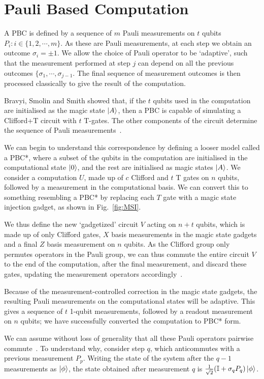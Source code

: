 \documentclass{standalone}
\begin{document}
\section{Pauli Based Computation}\label{sec:pbc}
A PBC is defined by a sequence of $m$ Pauli measurements on $t$ qubits $P_{i}:i\in\{1,2,\cdots,m\}$. As these are Pauli measurements, at each step we obtain an outcome $\sigma_{i}=\pm 1$. We allow the choice of Pauli operator to be `adaptive', such that the measurement performed at step $j$ can depend on all the previous outcomes $\{\sigma_{1},\cdots,\sigma_{j-1}$. The final sequence of measurement outcomes is then processed classically to give the result of the computation. 
\par
Bravyi, Smolin and Smith showed that, if the $t$ qubits used in the computation are initialised as the magic state $\ket{A}$, then a PBC is capable of simulating a Clifford+T circuit with $t$ T-gates. The other components of the circuit determine the sequence of Pauli measurements~\cite{Bravyi2015}. 
\par
We can begin to understand this correspondence by defining a looser model called a PBC*, where a subset of the qubits in the computation are initialised in the computational state $\ket{0}$, and the rest are initialised as magic states $\ket{A}$. We consider a computation $U$, made up of $c$ Clifford and $t$ T gates on $n$ qubits, followed by a measurement in the computational basis. We can convert this to something resembling a PBC* by replacing each $T$ gate with a magic state injection gadget, as shown in Fig.~\ref{fig:MSI}. 
\par
We thus define the new `gadgetized' circuit $V$ acting on $n+t$ qubits, which is made up of only Clifford gates, $X$ basis measurements in the magic state gadgets and a final $Z$ basis measurement on $n$ qubits. As the Clifford group only permutes operators in the Pauli group, we can thus commute the entire circuit $V$ to the end of the computation, after the final measurement, and discard these gates, updating the measurement operators accordingly~\cite{Bravyi2015}. 
\par
Because of the measurement-controlled correction in the magic state gadgets, the resulting Pauli measurements on the computational states will be adaptive. This gives a sequence of $t$ 1-qubit measurements, followed by a readout measurement on $n$ qubits; we have successfully converted the computation to PBC* form. 
\par
We can assume without loss of generality that all these Pauli operators pairwise commute~\cite{Bravyi2015}. To understand why, consider step $q$, which anticommutes with a previous measurement $P_{p}$. Writing the state of the system after the $q-1$ measurements as $\ket{\phi}$, the state obtained after measurement $q$ is $\frac{1}{\sqrt{2}}(\mathbb{I}+\sigma_{q}P_{q})\ket{\phi}$.
\end{document}
